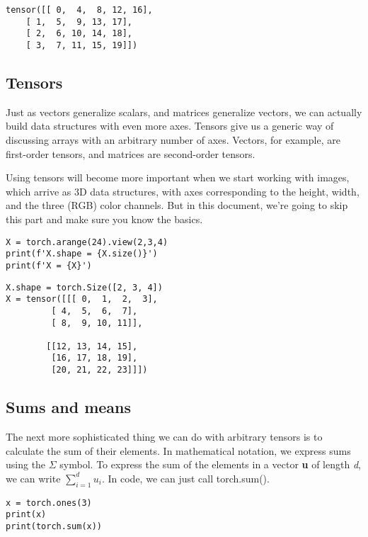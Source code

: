 \documentclass[]{article}
\begin{document}
\begin{verbatim}
tensor([[ 0,  4,  8, 12, 16],
	[ 1,  5,  9, 13, 17],
	[ 2,  6, 10, 14, 18],
	[ 3,  7, 11, 15, 19]])
\end{verbatim}

\subsection{Tensors}

Just as vectors generalize scalars, and matrices generalize vectors, we can actually build data structures with even more axes. Tensors give us a generic way of discussing arrays with an arbitrary number of axes. Vectors, for example, are first-order tensors, and matrices are second-order tensors.

Using tensors will become more important when we start working with images, which arrive as 3D data structures, with axes corresponding to the height, width, and the three (RGB) color channels. But in this document, we’re going to skip this part and make sure you know the basics.

\begin{verbatim}
X = torch.arange(24).view(2,3,4)
print(f'X.shape = {X.size()}')
print(f'X = {X}')
\end{verbatim}

\begin{verbatim}
X.shape = torch.Size([2, 3, 4])
X = tensor([[[ 0,  1,  2,  3],
	     [ 4,  5,  6,  7],
	     [ 8,  9, 10, 11]],
	
	    [[12, 13, 14, 15],
	     [16, 17, 18, 19],
	     [20, 21, 22, 23]]])
\end{verbatim}

\subsection{Sums and means}

The next more sophisticated thing we can do with arbitrary tensors is to calculate the sum of their elements. In mathematical notation, we express sums using the $ \Sigma $ symbol. To express the sum of the elements in a vector \textbf{u} of length \textit{d}, we can write $ \sum_{i=1}^{d} u_i $. In code, we can just call torch.sum().

\begin{verbatim}
x = torch.ones(3)
print(x)
print(torch.sum(x))
\end{verbatim}
\end{document}
